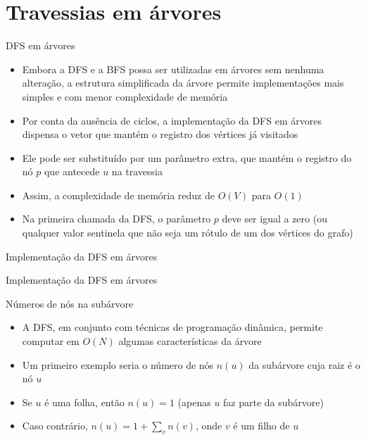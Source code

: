 \section{Travessias em árvores}

\begin{frame}[fragile]{DFS em árvores}

    \begin{itemize}
        \item Embora a DFS e a BFS possa ser utilizadas em árvores sem nenhuma alteração,
            a estrutura simplificada da árvore permite implementações mais simples e com
            menor complexidade de memória
            
        \item Por conta da ausência de ciclos, a implementação da DFS em árvores dispensa o
            vetor que mantém o registro dos vértices já visitados

        \item Ele pode ser substituído por um parâmetro extra, que mantém o registro do nó $p$ que
            antecede $u$ na travessia

        \item Assim, a complexidade de memória reduz de $O(V)$ para $O(1)$

        \item Na primeira chamada da DFS, o parâmetro $p$ deve ser igual a zero (ou qualquer
            valor sentinela que não seja um rótulo de um dos vértices do grafo)
    \end{itemize}

\end{frame}

\begin{frame}[fragile]{Implementação da DFS em árvores}
\end{frame}

\begin{frame}[fragile]{Implementação da DFS em árvores}
\end{frame}

\begin{frame}[fragile]{Números de nós na subárvore}

    \begin{itemize}
        \item A DFS, em conjunto com técnicas de programação dinâmica, permite computar em
            $O(N)$ algumas características da árvore

        \item Um primeiro exemplo seria o número de nós $n(u)$ da subárvore cuja raiz é o nó $u$

        \item Se $u$ é uma folha, então $n(u) = 1$ (apenas $u$ faz parte da subárvore)

        \item Caso contrário, $n(u) = 1 + \sum_v n(v)$, onde $v$ é um filho de $u$
    \end{itemize}

\end{frame}

